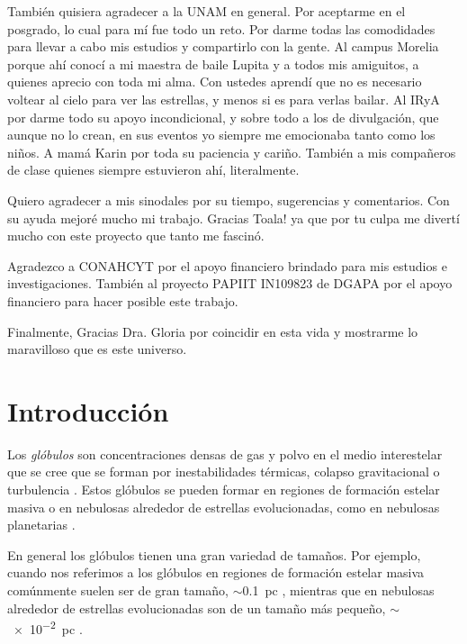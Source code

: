 \documentclass{book}
\begin{document}
También quisiera agradecer a la UNAM en general. Por aceptarme en el posgrado, lo cual para mí fue todo un reto. Por darme todas las comodidades para llevar a cabo mis estudios y compartirlo con la gente. Al campus Morelia porque ahí conocí a mi maestra de baile Lupita y a todos mis amiguitos, a quienes aprecio con toda mi alma. Con ustedes aprendí que no es necesario voltear al cielo para ver las estrellas, y menos si es para verlas bailar. Al IRyA por darme todo su apoyo incondicional, y sobre todo a los de divulgación, que aunque no lo crean, en sus eventos yo siempre me emocionaba tanto como los niños. A mamá Karin por toda su paciencia y cariño. También a mis compañeros de clase quienes siempre estuvieron ahí, literalmente.

Quiero agradecer a mis sinodales por su tiempo, sugerencias y comentarios. Con su ayuda mejoré mucho mi trabajo. Gracias Toala! ya que por tu culpa me divertí mucho con este proyecto que tanto me fascinó.

Agradezco a CONAHCYT por el apoyo financiero brindado para mis estudios e investigaciones. También al proyecto PAPIIT IN109823 de DGAPA por el apoyo financiero para hacer posible este trabajo.

Finalmente, Gracias Dra. Gloria por coincidir en esta vida y mostrarme lo maravilloso que es este universo.

\newpage

\tableofcontents

\newpage

\chapter{Introducción}\label{Capitulo 1:introduccion}

Los \textit{glóbulos} son concentraciones densas de gas y polvo en el medio interestelar que se cree que se forman por inestabilidades térmicas, colapso gravitacional o turbulencia \citep{Ballesteros:2011,Padoan:2002}. Estos glóbulos se pueden formar en regiones de formación estelar masiva o en nebulosas alrededor de estrellas evolucionadas, como en nebulosas planetarias \citep{O'Dell:2007}.

En general los glóbulos tienen una gran variedad de tamaños. Por ejemplo, cuando nos referimos a los glóbulos en regiones de formación estelar masiva comúnmente suelen ser de gran tamaño, $\sim$\SI{0.1}{pc} \citep{Schenider:2016}, mientras que en nebulosas alrededor de estrellas evolucionadas son de un tamaño más pequeño, $\sim$\SI{e-2}{pc} \citep{GFGahm:2013}.
\end{document}
